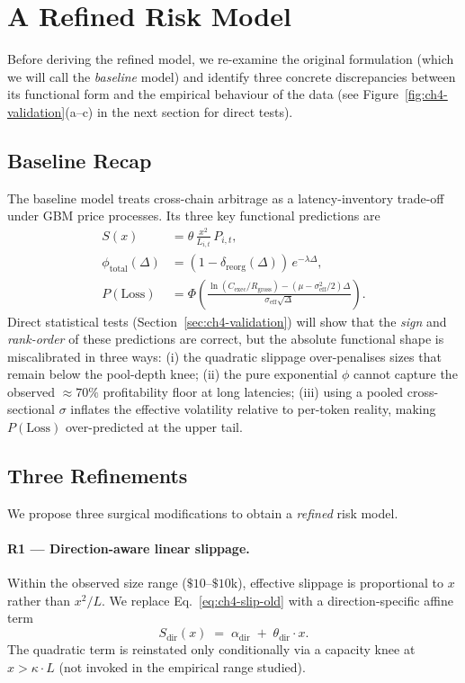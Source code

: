 \documentclass[sigconf,nonacm,10pt]{acmart}
\newcommand{\Cexec}{C_{\text{exec}}}
\newcommand{\Rgross}{R_{\text{gross}}}
\begin{document}
\section{A Refined Risk Model}
\label{sec:ch4-refined-model}

Before deriving the refined model, we re-examine the original formulation
(which we will call the \textit{baseline} model) and identify three
concrete discrepancies between its functional form and the empirical
behaviour of the data (see Figure~\ref{fig:ch4-validation}(a--c) in the
next section for direct tests).

\subsection{Baseline Recap}

The baseline model treats cross-chain arbitrage as a latency-inventory
trade-off under GBM price processes. Its three key functional
predictions are
\begin{align}
    \label{eq:ch4-slip-old}
    S(x) &= \theta\,\frac{x^{2}}{L_{i,t}}\,P_{i,t}, \\
    \label{eq:ch4-phi-old}
    \phi_{\text{total}}(\Delta) &= (1-\delta_{\text{reorg}}(\Delta))\,
        e^{-\lambda\Delta}, \\
    \label{eq:ch4-ploss-old}
    P(\text{Loss}) &= \Phi\!\left(\frac{\ln(\Cexec/\Rgross) -
        (\mu - \sigma_{\text{eff}}^{2}/2)\Delta}
        {\sigma_{\text{eff}}\sqrt{\Delta}}\right).
\end{align}
Direct statistical tests (Section~\ref{sec:ch4-validation}) will show that
the \emph{sign} and \emph{rank-order} of these predictions are correct,
but the absolute functional shape is miscalibrated in three ways: (i) the
quadratic slippage over-penalises sizes that remain below the pool-depth
knee; (ii) the pure exponential $\phi$ cannot capture the observed $\approx
70\%$ profitability floor at long latencies; (iii) using a pooled
cross-sectional $\sigma$ inflates the effective volatility relative to
per-token reality, making $P(\text{Loss})$ over-predicted at the upper
tail.

\subsection{Three Refinements}

We propose three surgical modifications to obtain a \textit{refined} risk
model.

\paragraph{R1 --- Direction-aware linear slippage.} Within the observed
size range ($\$10$--$\$10$k), effective slippage is proportional to $x$
rather than $x^{2}/L$. We replace Eq.~\eqref{eq:ch4-slip-old} with a
direction-specific affine term
\begin{equation}
\label{eq:ch4-slip-new}
    S_{\text{dir}}(x) \;=\; \alpha_{\text{dir}} \;+\; \theta_{\text{dir}}\cdot x.
\end{equation}
The quadratic term is reinstated only conditionally via a capacity knee at
$x > \kappa\cdot L$ (not invoked in the empirical range studied).
\end{document}
